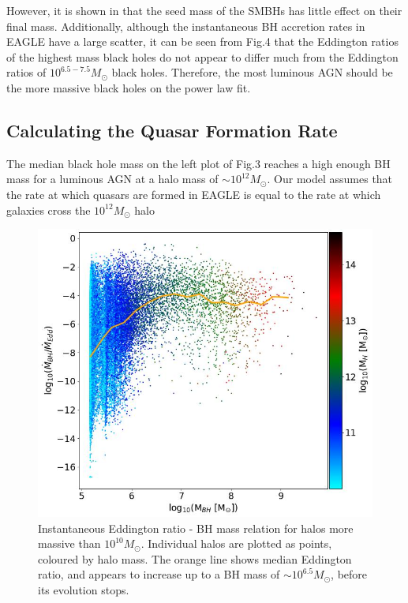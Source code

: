 \documentclass[12pt, twocolumn]{report}%
\begin{document}
 \noindent However, it is shown in \cite{Quasar} that the seed mass of the SMBHs has little effect on their final mass. Additionally, although the instantaneous BH accretion rates in EAGLE have a large scatter, it can be seen from Fig.4 that the Eddington ratios of the highest mass black holes do not appear to differ much from the Eddington ratios of $10^{6.5-7.5}M_\odot$ black holes. Therefore, the most luminous AGN should be the more massive black holes on the power law fit.\par

 \subsection{Calculating the Quasar Formation Rate}

The median black hole mass on the left plot of Fig.3 reaches a high enough BH mass for a luminous AGN at a halo mass of $\sim10^{12}M_\odot$. Our model assumes that the rate at which quasars are formed in EAGLE is equal to the rate at which galaxies cross the $10^{12}M_\odot$ halo 

\begin{figure}[H]
\centering
\includegraphics[width=\linewidth]{Plot_12.jpeg}
\caption{Instantaneous Eddington ratio - BH mass relation for halos more massive than $10^{10}M_\odot$. Individual halos are plotted as points, coloured by halo mass. The orange line shows median Eddington ratio, and appears to increase up to a BH mass of $\sim10^{6.5}M_\odot$, before its evolution stops.}
\label{fig:4}
\end{figure}
\end{document}
